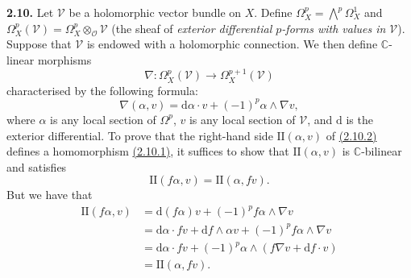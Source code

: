 \documentclass{report}
\newenvironment{rmenv}[1]
  {\phantomsection\par\medskip\noindent\textbf{#1.}\rmfamily}
  {\medskip}
\renewcommand{\cal}[1]{{\mathcal{#1}}}
\newcommand{\CC}{\mathbb{C}}
\newcommand{\dd}{\mathrm{d}}
\newcommand{\II}{\mathrm{II}}
\begin{document}
\begin{rmenv}{2.10}
\label{I.2.10}
  Let $\cal{V}$ be a holomorphic vector bundle on $X$.
  Define $\Omega_X^p=\bigwedge^p\Omega_X^1$ and $\Omega_X^p(\cal{V})=\Omega_X^p\otimes_\cal{O}\cal{V}$ (the sheaf of \emph{exterior differential $p$-forms with values in $\cal{V}$}).
  Suppose that $\cal{V}$ is endowed with a holomorphic connection.
  We then define $\CC$-linear morphisms
  \[
  \label{I.2.10.1}
    \nabla\colon \Omega_X^p(\cal{V}) \to \Omega_X^{p+1}(\cal{V})
  \tag{2.10.1}
  \]
  characterised by the following formula:
  \[
  \label{I.2.10.2}
    \nabla(\alpha,v) = \dd\alpha\cdot v + (-1)^p\alpha\wedge\nabla v,
  \tag{2.10.2}
  \]
  where $\alpha$ is any local section of $\Omega^p$, $v$ is any local section of $\cal{V}$, and $\dd$ is the exterior differential.
  To prove that the right-hand side $\II(\alpha,v)$ of \hyperref[I.2.10.2]{(2.10.2)} defines a homomorphism \hyperref[I.2.10.1]{(2.10.1)}, it suffices to show that $\II(\alpha,v)$ is $\CC$-bilinear and satisfies
  \[
    \II(f\alpha,v) = \II(\alpha,fv).
  \]
  But we have that
  \[
    \begin{aligned}
      \II(f\alpha,v)
      &= \dd(f\alpha)v + (-1)^pf\alpha\wedge\nabla v
    \\&= \dd\alpha\cdot fv + \dd f\wedge\alpha v + (-1)^pf\alpha\wedge\nabla v
    \\&= \dd\alpha\cdot fv + (-1)^p\alpha\wedge(f\nabla v+\dd f\cdot v)
    \\&= \II(\alpha,fv).
    \end{aligned}
  \]


\end{rmenv}
\end{document}

